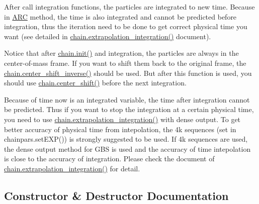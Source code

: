 \begin{DoxyEnumerate}
\item After call integration functions, the particles are integrated to new time. Because in \hyperlink{namespaceARC}{A\+RC} method, the time is also integrated and cannot be predicted before integration, thus the iteration need to be done to get correct physical time you want (see detailed in \hyperlink{classARC_1_1chain_ae4d0002cceee2397101a43b3755f927e}{chain.\+extrapolation\+\_\+integration()} document).
\item Notice that after \hyperlink{classARC_1_1chain_a3fe37720ceb48c14905c92d3e25e71a4}{chain.\+init()} and integration, the particles are always in the center-\/of-\/mass frame. If you want to shift them back to the original frame, the \hyperlink{classARC_1_1chain_a7bd0d1b03bcc2e7cdb146960e9d55ea3}{chain.\+center\+\_\+shift\+\_\+inverse()} should be used. But after this function is used, you should use \hyperlink{classARC_1_1chain_a73419f14f724668f4858a13c01cf7b70}{chain.\+center\+\_\+shift()} before the next integration.
\end{DoxyEnumerate}

Because of time now is an integrated variable, the time after integration cannot be predicted. Thus if you want to stop the integration at a certain physical time, you need to use \hyperlink{classARC_1_1chain_ae4d0002cceee2397101a43b3755f927e}{chain.\+extrapolation\+\_\+integration()} with dense output. To get better accuracy of physical time from intepolation, the 4k sequences (set in chainpars.\+set\+E\+X\+P()) is strongly suggested to be used. If 4k sequences are used, the dense output method for G\+BS is used and the accuracy of time intepolation is close to the accuracy of integration. Please check the document of \hyperlink{classARC_1_1chain_ae4d0002cceee2397101a43b3755f927e}{chain.\+extrapolation\+\_\+integration()} for detail. 

\subsection{Constructor \& Destructor Documentation}
\hypertarget{classARC_1_1chain_af5c20ba1cd4cbefc736e1df84962dbe1}{}\label{classARC_1_1chain_af5c20ba1cd4cbefc736e1df84962dbe1} 
